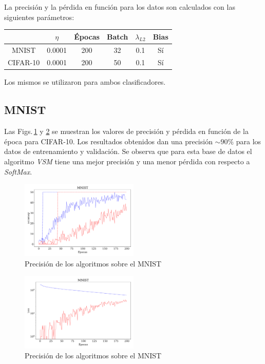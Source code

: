 La precisión y la pérdida en función para los datos son calculados con las siguientes parámetros:

\begin{table}[H]
    \centering
    \begin{tabular}{c|c|c|c|c|c}
             &  $\eta$ & Épocas & Batch & $\lambda_{L2}$ & Bias \\ \hline
    MNIST    &  0.0001 & 200 & 32 & 0.1 & Sí \\ \hline
    CIFAR-10 &  0.0001 & 200 & 50 & 0.1 & Sí \\ 
    \end{tabular}
\end{table}
Los mismos se utilizaron para ambos clasificadores.

\subsection*{MNIST} 

Las Figs.\,\ref{fig:ejer5_mnist_acc} y \ref{fig:ejer5_mnist_loss} se muestran los valores de precisión y pérdida en función de la época para CIFAR-10.  Los resultados obtenidos dan una precisión $\sim90\%$ para los datos de entrenamiento y validación. Se observa que para esta base de datos el algoritmo \emph{VSM} tiene una mejor precisión y una menor pérdida con respecto a \emph{SoftMax}.

\begin{figure}[H]
    \centering
    \includegraphics[width=0.5\textwidth]{../../ejer_5_MNIST_acc.pdf}
    \caption{Precisión de los algoritmos sobre el MNIST}
    \label{fig:ejer5_mnist_acc}
\end{figure} 

\begin{figure}[H]
    \centering
    \includegraphics[width=0.5\textwidth]{../../ejer_5_MNIST_los.pdf}
    \caption{Precisión de los algoritmos sobre el MNIST}
    \label{fig:ejer5_mnist_loss}
\end{figure} 


